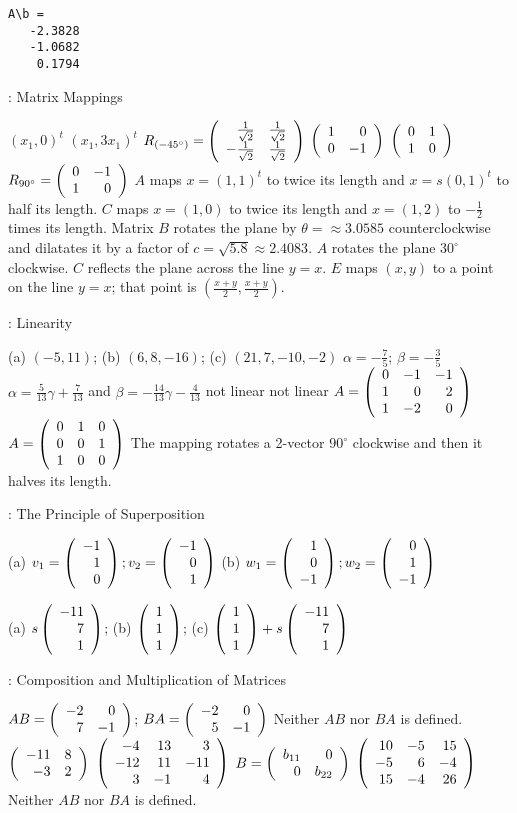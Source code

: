 \begin{verbatim}
A\b =
   -2.3828
   -1.0682
    0.1794
\end{verbatim}


: Matrix Mappings

 \ans $(x_1,0)^t$
 \ans $(x_1,3x_1)^t$
 \ans $R_{(-45^\circ)}  =
\left(\begin{array}{rr} \frac{1}{\sqrt{2}} & \frac{1}{\sqrt{2}}\\ -\frac{1}{\sqrt{2}} &\frac{1}{\sqrt{2}}\end{array}\right)$
 \ans $\left(\begin{array}{rr} 1 & 0\\ 0 &-1\end{array}\right)$
 \ans $\left(\begin{array}{rr} 0 & 1\\ 1 &0\end{array}\right)$
 \ans  $R_{90^\circ} = \left(\begin{array}{rr} 0 & -1\\ 1 &0\end{array}\right)$
 $A$ maps $x = (1,1)^t$ to twice its length and 
$x = s(0,1)^t$ to half its length.
 $C$ maps $x = (1,0)$ to twice its length and 
$x = (1,2)$ to $-\frac{1}{2}$ times its length.
 \ans Matrix $B$ rotates the plane by $\theta =
\approx 3.0585$ counterclockwise and dilatates it by a factor of
$c = \sqrt{5.8} \approx 2.4083$.
 $A$ rotates the plane $30^\circ$ clockwise.
 $C$ reflects the plane across the line $y = x$.
 $E$ maps $(x,y)$ to a point on the line $y = x$; that
point is $(\frac{x + y}{2}, \frac{x + y}{2})$.


: Linearity


(a) $(-5,11)$;
(b) $(6,8,-16)$;
(c) $(21,7,-10,-2)$
  $\alpha = -\frac{7}{5}$; $\beta = -\frac{3}{5}$
 \ans $\alpha = \frac{5}{13}\gamma + \frac{7}{13}$ and 
$\beta = -\frac{14}{13}\gamma - \frac{4}{13}$
 \ans not linear
 \ans not linear
 \ans  $A = \left(\begin{array}{rrr} 0 & -1 & -1 \\ 1 & 0 & 2 \\ 1 & -2 & 0\end{array}\right)$
 \ans $A = \left(\begin{array}{rrr} 0 & 1 & 0 \\ 0 & 0 & 1 \\ 1 & 0 & 0\end{array}\right)$
  The mapping rotates a 2-vector $90^\circ$ clockwise and 
then it halves its length.


: The Principle of Superposition

(a) \ans $v_1 = \left(\begin{array}{r} -1 \\ 1 \\ 0\end{array}\right); v_2 = \left(\begin{array}{r} -1 \\ 0 \\ 1\end{array}\right)$
(b) \ans $w_1 = \left(\begin{array}{r} 1 \\ 0 \\ -1\end{array}\right); w_2 = \left(\begin{array}{r} 0 \\ 1 \\ -1\end{array}\right)$

(a) \ans $s\left(\begin{array}{r} -11 \\ 7 \\ 1\end{array}\right)$;
(b) \ans $\left(\begin{array}{r} 1 \\ 1 \\ 1\end{array}\right)$;
(c) \ans $\left(\begin{array}{r} 1 \\ 1 \\ 1\end{array}\right) + s\left(\begin{array}{r} -11 \\ 7 \\ 1\end{array}\right)$



: Composition and Multiplication of Matrices

 $AB=\left(\begin{array}{rr} -2 & 0\\ 7 &-1\end{array}\right)$; $BA= \left(\begin{array}{rr} -2 & 0\\ 5 &-1\end{array}\right)$
 Neither $AB$ nor $BA$ is defined. 
  $\left(\begin{array}{rr} -11 & 8\\ -3 &2\end{array}\right)$
 $\left(\begin{array}{rrr} -4 & 13 & 3 \\ -12 & 11 & -11 \\ 3 & -1 & 4\end{array}\right)$
 \ans $B=\left(\begin{array}{rr} b_{11} & 0\\ 0 &b_{22}\end{array}\right)$
 $\left(\begin{array}{rrr} 10 & -5 & 15 \\ -5 & 6 & -4 \\ 15 & -4 & 26\end{array}\right)$
 Neither $AB$ nor $BA$ is defined.



